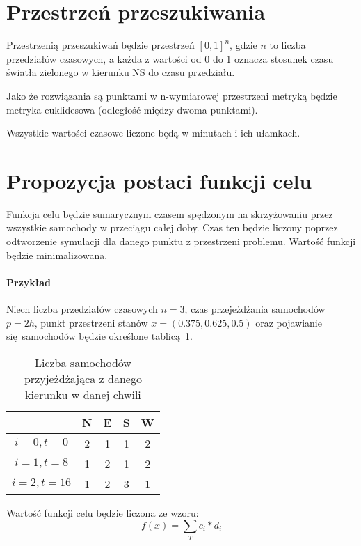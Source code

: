 \documentclass[a4paper]{article}
\begin{document}
\section{Przestrzeń przeszukiwania}
Przestrzenią przeszukiwań będzie przestrzeń $[0, 1]^n$, gdzie $n$ to liczba
przedziałów czasowych, a każda z wartości od 0 do 1 oznacza stosunek czasu światła
zielonego w kierunku NS do czasu przedziału.

Jako że rozwiązania są punktami w n-wymiarowej przestrzeni metryką będzie
metryka euklidesowa (odległość między dwoma punktami).

Wszystkie wartości czasowe liczone będą w minutach i ich ułamkach.

\section{Propozycja postaci funkcji celu}
Funkcja celu będzie sumarycznym czasem spędzonym na skrzyżowaniu przez wszystkie
samochody w przeciągu całej doby. Czas ten będzie liczony poprzez odtworzenie
symulacji dla danego punktu z przestrzeni problemu. Wartość funkcji będzie
minimalizowana.

\paragraph{Przykład} Niech liczba przedziałów czasowych $n=3$, czas
przejeżdżania samochodów $p=2h$, punkt przestrzeni stanów $x=(0.375, 0.625, 0.5)$
oraz pojawianie się samochodów będzie określone tablicą~\ref{tab:example}.

\begin{table}[ht]
    \centering
    \begin{tabular}{| c | c | c | c | c |}
        \hline
         & N & E & S & W \\ \hline
         $i=0, t=0$ & 2 & 1 & 1 & 2\\ \hline
         $i=1, t=8$ & 1 & 2 & 1 & 2\\ \hline
         $i=2, t=16$ & 1 & 2 & 3 & 1\\ \hline
    \end{tabular}
    \caption{Liczba samochodów przyjeżdżająca z danego kierunku w danej chwili\label{tab:example}}
\end{table}

Wartość funkcji celu będzie liczona ze wzoru:
$$f(x) = \sum\limits_{T} c_i * d_i $$
\end{document}

